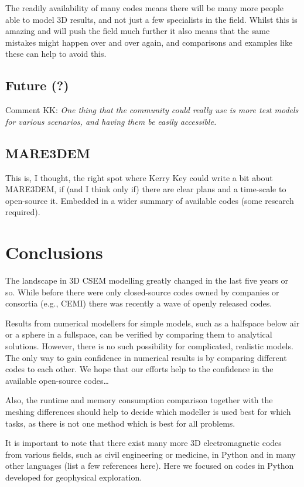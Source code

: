 \documentclass[
    paper,
  ]{geophysics}
\begin{document}
The readily availability of many codes means there will be many more people
able to model 3D results, and not just a few specialists in the field. Whilst
this is amazing and will push the field much further it also means that the
same mistakes might happen over and over again, and comparisons and examples
like these can help to avoid this.

\subsection{Future (?)}

Comment KK: \emph{One thing that the community could really use is more test
models for various scenarios, and having them be easily accessible.}


\subsection{MARE3DEM}

This is, I thought, the right spot where Kerry Key could write a bit about
MARE3DEM, if (and I think only if) there are clear plans and a time-scale to
open-source it. Embedded in a wider summary of available codes (some research
required).

\section{Conclusions}

The landscape in 3D CSEM modelling greatly changed in the last five years or
so. While before there were only closed-source codes owned by companies or
consortia (e.g., CEMI) there was recently a wave of openly released codes.

Results from numerical modellers for simple models, such as a halfspace below
air or a sphere in a fullspace, can be verified by comparing them to analytical
solutions. However, there is no such possibility for complicated, realistic
models. The only way to gain confidence in numerical results is by comparing
different codes to each other. We hope that our efforts help to the confidence
in the available open-source codes\dots

Also, the runtime and memory consumption comparison together with the meshing
differences should help to decide which modeller is used best for which tasks,
as there is not one method which is best for all problems.

It is important to note that there exist many more 3D electromagnetic codes
from various fields, such as civil engineering or medicine, in Python and in
many other languages (list a few references here). Here we focused on codes in
Python developed for geophysical exploration.
\end{document}
